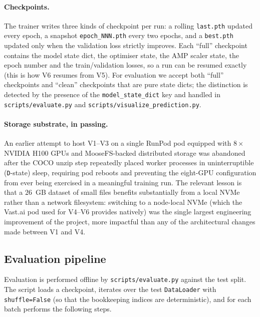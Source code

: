 \paragraph{Checkpoints.} The trainer writes three kinds of checkpoint per run:
a rolling \texttt{last.pth} updated every epoch, a snapshot
\texttt{epoch\_NNN.pth} every two epochs, and a \texttt{best.pth} updated only
when the validation loss strictly improves. Each ``full'' checkpoint contains
the model state dict, the optimiser state, the AMP scaler state, the epoch
number and the train/validation losses, so a run can be resumed exactly
(this is how V6 resumes from V5). For evaluation we accept both ``full''
checkpoints and ``clean'' checkpoints that are pure state dicts; the
distinction is detected by the presence of the \texttt{model\_state\_dict} key
and handled in \texttt{scripts/evaluate.py} and
\texttt{scripts/visualize\_prediction.py}.

\paragraph{Storage substrate, in passing.} An earlier attempt to host V1--V3
on a single RunPod pod equipped with $8\!\times$ NVIDIA H100 GPUs and
MooseFS-backed distributed storage was abandoned after the COCO unzip step
repeatedly placed worker processes in uninterruptible (\texttt{D}-state)
sleep, requiring pod reboots and preventing the eight-GPU configuration from
ever being exercised in a meaningful training run. The relevant lesson is
that a $26$~GB dataset of small files benefits substantially from a local
NVMe rather than a network filesystem: switching to a node-local NVMe (which
the Vast.ai pod used for V4--V6 provides natively) was the single largest
engineering improvement of the project, more impactful than any of the
architectural changes made between V1 and V4.

\subsection{Evaluation pipeline}
\label{sec:impl:eval}

Evaluation is performed offline by \texttt{scripts/evaluate.py} against the
test split. The script loads a checkpoint, iterates over the test
\texttt{DataLoader} with \texttt{shuffle=False} (so that the bookkeeping
indices are deterministic), and for each batch performs the following steps.

